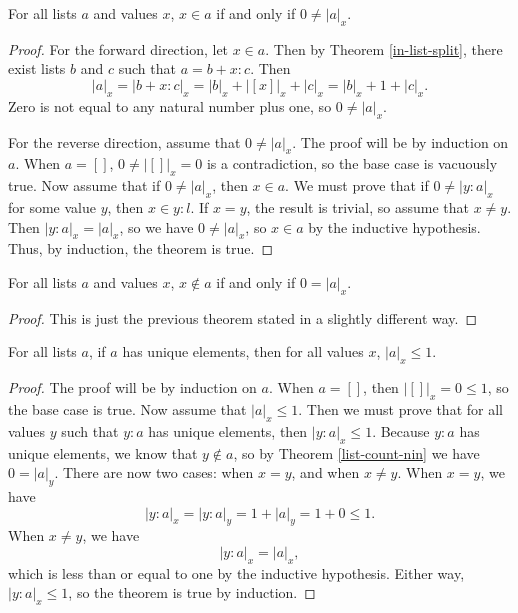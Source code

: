 \documentclass[../math.tex]{subfiles}
\begin{document}
\begin{theorem} \label{list-count-in}
    For all lists $a$ and values $x$, $x \in a$ if and only if $0 \neq |a|_x$.
\end{theorem}
\begin{proof}
    For the forward direction, let $x \in a$.  Then by Theorem
    \ref{in-list-split}, there exist lists $b$ and $c$ such that $a = b + x :
    c$.  Then
    \[
        |a|_x = |b + x : c|_x = |b|_x + |[x]|_x + |c|_x = |b|_x + 1 + |c|_x.
    \]
    Zero is not equal to any natural number plus one, so $0 \neq |a|_x$.

    For the reverse direction, assume that $0 \neq |a|_x$.  The proof will be by
    induction on $a$.  When $a = []$, $0 \neq |[]|_x = 0$ is a contradiction, so
    the base case is vacuously true.  Now assume that if $0 \neq |a|_x$, then $x
    \in a$.  We must prove that if $0 \neq |y : a|_x$ for some value $y$, then
    $x \in y : l$.  If $x = y$, the result is trivial, so assume that $x \neq
    y$.  Then $|y : a|_x = |a|_x$, so we have $0 \neq |a|_x$, so $x \in a$ by
    the inductive hypothesis.  Thus, by induction, the theorem is true.
\end{proof}

\begin{theorem} \label{list-count-nin}
    For all lists $a$ and values $x$, $x \notin a$ if and only if $0 = |a|_x$.
\end{theorem}
\begin{proof}
    This is just the previous theorem stated in a slightly different way.
\end{proof}

\begin{theorem} \label{list-count-unique}
    For all lists $a$, if $a$ has unique elements, then for all values $x$,
    $|a|_x \leq 1$.
\end{theorem}
\begin{proof}
    The proof will be by induction on $a$.  When $a = []$, then $|[]|_x = 0 \leq
    1$, so the base case is true.  Now assume that $|a|_x \leq 1$.  Then we must
    prove that for all values $y$ such that $y : a$ has unique elements, then
    $|y : a|_x \leq 1$.  Because $y : a$ has unique elements, we know that $y
    \notin a$, so by Theorem \ref{list-count-nin} we have $0 = |a|_y$.  There
    are now two cases: when $x = y$, and when $x \neq y$.  When $x = y$, we have
    \[
        |y : a|_x = |y : a|_y = 1 + |a|_y = 1 + 0 \leq 1.
    \]
    When $x \neq y$, we have
    \[
        |y : a|_x = |a|_x,
    \]
    which is less than or equal to one by the inductive hypothesis.  Either way,
    $|y : a|_x \leq 1$, so the theorem is true by induction.
\end{proof}
\end{document}
